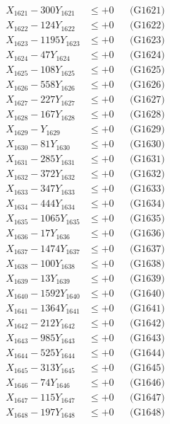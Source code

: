 \documentclass[a4paper,10pt]{article}
\begin{document}
{\begin{align}
\allowbreak
X_{1621} - 300Y_{1621} &\leq +0 && \text{(G1621)} \\
X_{1622} - 124Y_{1622} &\leq +0 && \text{(G1622)} \\
X_{1623} - 1195Y_{1623} &\leq +0 && \text{(G1623)} \\
X_{1624} - 47Y_{1624} &\leq +0 && \text{(G1624)} \\
X_{1625} - 108Y_{1625} &\leq +0 && \text{(G1625)} \\
X_{1626} - 558Y_{1626} &\leq +0 && \text{(G1626)} \\
X_{1627} - 227Y_{1627} &\leq +0 && \text{(G1627)} \\
X_{1628} - 167Y_{1628} &\leq +0 && \text{(G1628)} \\
X_{1629} - Y_{1629} &\leq +0 && \text{(G1629)} \\
X_{1630} - 81Y_{1630} &\leq +0 && \text{(G1630)} \\
\allowbreak
X_{1631} - 285Y_{1631} &\leq +0 && \text{(G1631)} \\
X_{1632} - 372Y_{1632} &\leq +0 && \text{(G1632)} \\
X_{1633} - 347Y_{1633} &\leq +0 && \text{(G1633)} \\
X_{1634} - 444Y_{1634} &\leq +0 && \text{(G1634)} \\
X_{1635} - 1065Y_{1635} &\leq +0 && \text{(G1635)} \\
X_{1636} - 17Y_{1636} &\leq +0 && \text{(G1636)} \\
X_{1637} - 1474Y_{1637} &\leq +0 && \text{(G1637)} \\
X_{1638} - 100Y_{1638} &\leq +0 && \text{(G1638)} \\
X_{1639} - 13Y_{1639} &\leq +0 && \text{(G1639)} \\
X_{1640} - 1592Y_{1640} &\leq +0 && \text{(G1640)} \\
\allowbreak
X_{1641} - 1364Y_{1641} &\leq +0 && \text{(G1641)} \\
X_{1642} - 212Y_{1642} &\leq +0 && \text{(G1642)} \\
X_{1643} - 985Y_{1643} &\leq +0 && \text{(G1643)} \\
X_{1644} - 525Y_{1644} &\leq +0 && \text{(G1644)} \\
X_{1645} - 313Y_{1645} &\leq +0 && \text{(G1645)} \\
X_{1646} - 74Y_{1646} &\leq +0 && \text{(G1646)} \\
X_{1647} - 115Y_{1647} &\leq +0 && \text{(G1647)} \\
X_{1648} - 197Y_{1648} &\leq +0 && \text{(G1648)} \\

\end{align}}
\end{document}
